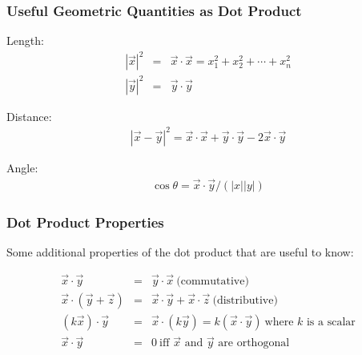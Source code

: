 \documentclass{beamer}
\begin{document}
\begin{frame}
  \frametitle{Useful Geometric Quantities as Dot Product}


Length:
\begin{eqnarray*}
|\vec{x}|^2 & = & \vec{x} \cdot \vec{x}  =  x_1^2 + x_2^2 + \cdots + x_n^2\\
|\vec{y}|^2 & = & \vec{y} \cdot \vec{y}
\end{eqnarray*}

Distance:
\begin{eqnarray*}
|\vec{x}-\vec{y}|^2 = \vec{x} \cdot \vec{x} + \vec{y} \cdot \vec{y} - 2 \vec{x} \cdot \vec{y}
\end{eqnarray*}

Angle:
\begin{eqnarray*}
\cos \theta = \vec{x} \cdot \vec{y}/(|x||y|)
\end{eqnarray*}

\begin{center}


\end{center}

\end{frame}

\begin{frame}
  \frametitle{Dot Product Properties}

Some additional properties of the dot product that are useful to know:

\begin{eqnarray*}
\vec{x} \cdot \vec{y} & = & \vec{y} \cdot \vec{x} \ \mbox{(commutative)} \\
\vec{x} \cdot (\vec{y} + \vec{z}) & = & \vec{x} \cdot \vec{y} + \vec{x} \cdot \vec{z} \ \mbox{(distributive)}\\
(k\vec{x}) \cdot \vec{y} & = & \vec{x} \cdot (k\vec{y}) = k(\vec{x} \cdot \vec{y}) \ \mbox{where $k$ is a scalar} \\
\vec{x} \cdot \vec{y} & = & 0 \ \mbox{iff $\vec{x}$ and $\vec{y}$ are orthogonal}
\end{eqnarray*}

\end{frame}
\end{document}

